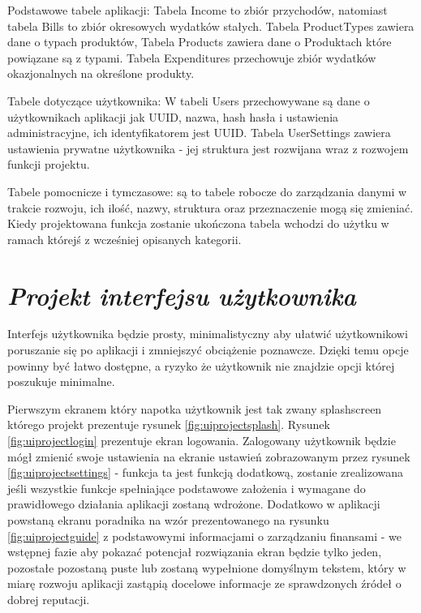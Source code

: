\documentclass[a4paper,10pt, twoside]{report}
\newcommand{\customstylesection}[1]{\textbf{\textit{#1}}}
\begin{document}
\begin{large}
{Podstawowe tabele aplikacji: Tabela Income to zbiór przychodów, natomiast 
tabela Bills to zbiór okresowych wydatków stałych. Tabela ProductTypes zawiera 
dane o typach produktów, Tabela Products zawiera dane o Produktach które 
powiązane są z typami. Tabela Expenditures przechowuje zbiór wydatków 
okazjonalnych na określone produkty.}

{Tabele dotyczące użytkownika: W tabeli Users przechowywane są dane o 
użytkownikach aplikacji jak UUID, nazwa, hash hasła i ustawienia 
administracyjne, ich identyfikatorem jest UUID. Tabela UserSettings zawiera 
ustawienia prywatne użytkownika - jej struktura jest rozwijana wraz z rozwojem 
funkcji projektu.}

{Tabele pomocnicze i tymczasowe: są to tabele robocze do zarządzania danymi w 
trakcie rozwoju, ich ilość, nazwy, struktura oraz przeznaczenie mogą się 
zmieniać. Kiedy projektowana funkcja zostanie ukończona tabela wchodzi do użytku
 w ramach którejś z wcześniej opisanych kategorii.}

\section{\customstylesection{Projekt interfejsu użytkownika}}
{Interfejs użytkownika będzie prosty, minimalistyczny aby ułatwić użytkownikowi 
poruszanie się po aplikacji i zmniejszyć obciążenie poznawcze. Dzięki temu opcje
 powinny być łatwo dostępne, a ryzyko że użytkownik nie znajdzie opcji której 
poszukuje minimalne.}

{Pierwszym ekranem który napotka użytkownik jest tak zwany splashscreen którego 
projekt prezentuje rysunek \ref*{fig:uiprojectsplash}. Rysunek 
\ref*{fig:uiprojectlogin} prezentuje ekran logowania. Zalogowany użytkownik 
będzie mógł zmienić swoje ustawienia na ekranie ustawień zobrazowanym przez 
rysunek \ref*{fig:uiprojectsettings} - funkcja ta jest funkcją dodatkową, 
zostanie zrealizowana jeśli wszystkie funkcje spełniające podstawowe założenia 
i wymagane do prawidłowego działania aplikacji zostaną wdrożone. Dodatkowo w 
aplikacji powstaną ekranu poradnika na wzór prezentowanego na rysunku 
\ref*{fig:uiprojectguide} z podstawowymi informacjami o zarządzaniu finansami - 
we wstępnej fazie aby pokazać potencjał rozwiązania ekran będzie tylko jeden, 
pozostałe pozostaną puste lub zostaną wypełnione domyślnym tekstem, który w 
miarę rozwoju aplikacji zastąpią docelowe informacje ze sprawdzonych źródeł o 
dobrej reputacji.}


\end{large}
\end{document}
